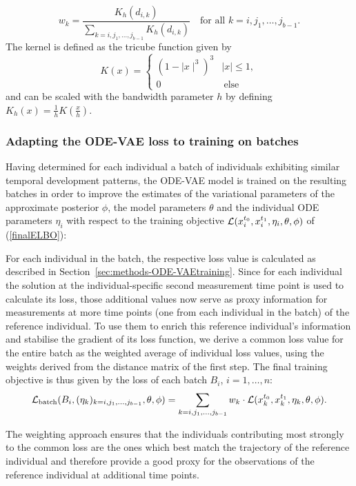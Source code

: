\begin{equation}\label{kernel-weights}
	w_k = \frac{K_h(d_{i,k})}{\sum_{k=i,j_1,\dots, j_{b-1}} K_h(d_{i,k})} \quad \text{for all } k=i,j_1,\dots, j_{b-1}. 
\end{equation}
The kernel is defined as the tricube function given by
$$
K(x) = \begin{cases}
(1-\mid x\mid^3)^3 & \mid x\mid \leq 1, \\
0 & \ \mathrm{else}
\end{cases}
$$
and can be scaled with the bandwidth parameter $h$ by defining  $K_h(x) = \frac{1}{h} K(\frac{x}{h})$. 

\subsubsection{Adapting the ODE-VAE loss to training on batches}

Having determined for each individual a batch of individuals exhibiting similar temporal development patterns, the ODE-VAE model is trained on the resulting batches in order to improve the estimates of the variational parameters of the approximate posterior $\phi$, the model parameters $\theta$ and the individual ODE parameters $\eta_i$ with respect to the training objective $\mathcal{L}(x_i^{t_0}, x_i^{t_1}, \eta_i,\theta,\phi)$ of (\ref{finalELBO}): 

For each individual in the batch, the respective loss value is calculated as described in Section~\ref{sec:methods-ODE-VAEtraining}. 
Since for each individual the solution at the individual-specific second measurement time point is used to calculate its loss, those additional values now serve as proxy information for measurements at more time points (one from each individual in the batch) of the reference individual. To use them to enrich this reference individual's information and stabilise the gradient of its loss function, we derive a common loss value for the entire batch as the weighted average of individual loss values, using the weights derived from the distance matrix of the first step. The final training objective is thus given by the loss of each batch $B_i$, $i=1,\dots, n$: 
\begin{equation}\label{batches-finalcommonloss}
	\mathcal{L}_{\mathrm{batch}}(B_i, (\eta_k)_{k=i,j_1,\dots, j_{b-1}}, \theta,\phi) = \sum_{k=i,j_1,\dots, j_{b-1}} w_k \cdot \mathcal{L}(x_k^{t_0}, x_k^{t_1}, \eta_k,\theta,\phi).
\end{equation} 

The weighting approach ensures that the individuals contributing most strongly to the common loss are the ones which best match the trajectory of the reference individual and therefore provide a good proxy for the observations of the reference individual at additional time points. 

